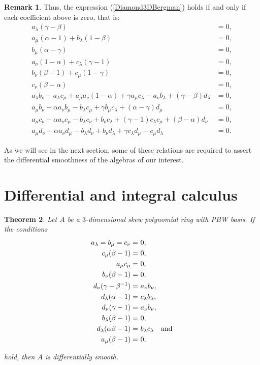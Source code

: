 \documentclass{amsart}
\newtheorem{theorem}{Theorem}[section]
\theoremstyle{definition}
\newtheorem{remark}[theorem]{Remark}
\theoremstyle{remark}
\numberwithin{equation}{section}
\begin{document}
\begin{remark}
Thus, the expression (\ref{Diamond3DBergman}) holds if and only if each coefficient above is zero, that is:
\begin{align}
a_{\lambda}(\gamma-\beta)&=0, \\
a_{\mu}(\alpha-1)+b_{\lambda}(1-\beta)&=0, \\
b_{\mu}(\alpha-\gamma)&=0, \\
a_{\nu}(1-\alpha)+c_{\lambda}(\gamma-1)&=0, \\
b_{\nu}(\beta-1)+c_{\mu}(1-\gamma)&=0,\\
c_{\nu}(\beta-\alpha)&=0, \\
a_{\lambda}b_{\nu}-a_{\lambda}c_{\mu}+a_{\mu}a_{\nu}(1-\alpha)+\gamma a_{\mu}c_{\lambda}-a_{\nu}b_{\lambda}+(\gamma-\beta)d_{\lambda}&=0, \\
a_{\mu}b_{\nu}-\alpha a_{\nu}b_{\mu}-b_{\lambda}c_{\mu}+\gamma b_{\mu}c_{\lambda}+(\alpha-\gamma)d_{\mu}&=0, \\
a_{\mu}c_{\nu}-\alpha a_{\nu}c_{\mu}-b_{\lambda}c_{\nu}+b_{\nu}c_{\lambda}+(\gamma-1)c_{\lambda}c_{\mu}+(\beta-\alpha)d_{\nu}&=0, \\
a_{\mu}d_{\nu}-\alpha a_{\nu}d_{\mu}-b_{\lambda}d_{\nu}+b_{\nu}d_{\lambda}+\gamma c_{\lambda}d_{\mu}-c_{\mu}d_{\lambda}&=0. 
\end{align}
\end{remark}

As we will see in the next section, some of these relations are required to assert the differential smoothness of the algebras of our interest.


\section{Differential and integral calculus}\label{Differentialandintegralcalculusbi-quadraticalgebras}

\begin{theorem}\label{Firsttheoremsmoothness3-dimensionalalgebras}
Let $A$ be a $3$-dimensional skew polynomial ring with PBW basis. If the conditions
\begin{align*}
    a_{\lambda} = b_{\mu} = c_{\nu} = &\ 0, \\
    c_{\mu}(\beta-1) = &\ 0,  \\
    a_{\mu}c_{\mu} = &\ 0,  \\
    b_{\nu}(\beta-1) = &\ 0,  \\
    d_{\nu}(\gamma-\beta^{-1}) = &\ a_{\nu}b_{\nu},  \\
    d_{\lambda}(\alpha-1) = &\ c_{\lambda}b_{\lambda},  \\
    d_{\nu}(\gamma-1) = &\ a_{\nu}b_{\nu}, \\
    b_{\lambda}(\beta-1) = &\ 0,  \\
    d_{\lambda}(\alpha\beta-1) = &\ b_{\lambda}c_{\lambda} \quad {\rm and}  \\
    a_{\mu}(\beta-1) = &\ 0, 
\end{align*}

hold, then $A$ is differentially smooth.
\end{theorem}
\end{document}
